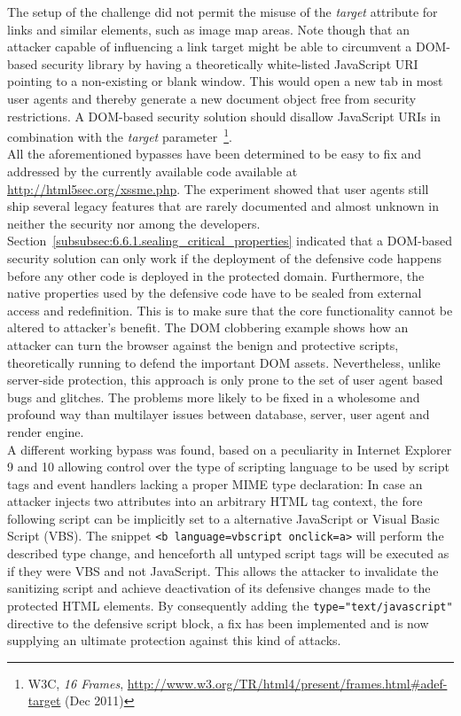       The setup of the challenge did not permit the misuse of the \textit{target} attribute for links and similar elements, such as image map areas. Note though that an attacker capable of influencing a link target might be able to circumvent a DOM-based security library by having a theoretically white-listed JavaScript URI pointing to a non-existing or blank window. This would open a new tab in most user agents and thereby generate a new document object free from security restrictions. A DOM-based security solution should disallow JavaScript URIs in combination with the \textit{target} parameter~\footnote{W3C, \textit{16 Frames}, \url{http://www.w3.org/TR/html4/present/frames.html#adef-target} (Dec 2011)}.\\

      All the aforementioned bypasses have been determined to be easy to fix and addressed by the currently available code available at \url{http://html5sec.org/xssme.php}. The experiment showed that user agents still ship several legacy features that are rarely documented and almost unknown in neither the security nor among the developers. Section~\ref{subsubsec:6.6.1.sealing_critical_properties} indicated that a DOM-based security solution can only work if the deployment of the defensive code happens before any other code is deployed in the protected domain. Furthermore, the native properties used by the defensive code have to be sealed from external access and redefinition. This is to make sure that the core functionality cannot be altered to attacker's benefit. The DOM clobbering example shows how an attacker can turn the browser against the benign and protective scripts, theoretically running to defend the important DOM assets. Nevertheless, unlike server-side protection, this approach is only prone to the set of user agent based bugs and glitches. The problems more likely to be fixed in a wholesome and profound way than multilayer issues between database, server, user agent and render engine. \\

      A different working bypass was found, based on a peculiarity in Internet Explorer 9 and 10 allowing control over the type of scripting language to be used by script tags and event handlers lacking a proper MIME type declaration: In case an attacker injects two attributes into an arbitrary HTML tag context, the fore following script can be implicitly set to a alternative JavaScript or Visual Basic Script (VBS). The snippet \texttt{<b language=vbscript onclick=a>} will perform the described type change, and henceforth all untyped script tags will be executed as if they were VBS and not JavaScript. This allows the attacker to invalidate the sanitizing script and achieve deactivation of its defensive changes made to the protected HTML elements. By consequently adding the \texttt{type="text/javascript"} directive to the defensive script block, a fix has been implemented and is now supplying an ultimate protection against this kind of attacks. \\

